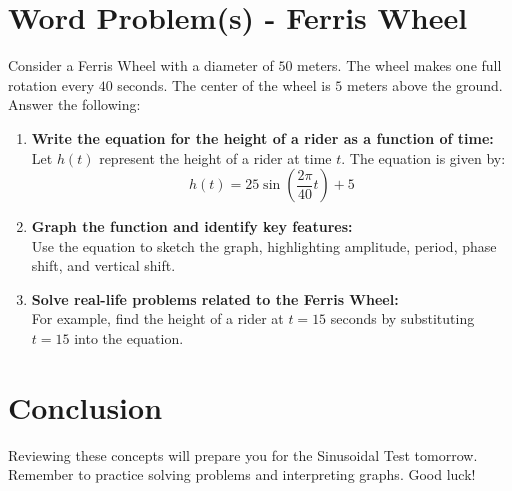 \documentclass{article}
\begin{document}
\section*{Word Problem(s) - Ferris Wheel}
Consider a Ferris Wheel with a diameter of $50$ meters. The wheel makes one full rotation every $40$ seconds. The center of the wheel is $5$ meters above the ground. Answer the following:
\begin{enumerate}
    \item \textbf{Write the equation for the height of a rider as a function of time:} \\
    Let $h(t)$ represent the height of a rider at time $t$. The equation is given by:
    \[ h(t) = 25 \sin\left(\frac{2\pi}{40}t\right) + 5 \]

    \item \textbf{Graph the function and identify key features:} \\
    Use the equation to sketch the graph, highlighting amplitude, period, phase shift, and vertical shift.

    \item \textbf{Solve real-life problems related to the Ferris Wheel:} \\
    For example, find the height of a rider at $t = 15$ seconds by substituting $t = 15$ into the equation.
\end{enumerate}

\section*{Conclusion}
Reviewing these concepts will prepare you for the Sinusoidal Test tomorrow. Remember to practice solving problems and interpreting graphs. Good luck!
\end{document}
